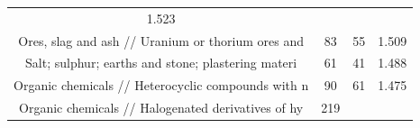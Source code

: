 \documentclass[10pt,]{article}
\begin{document}
\begin{longtable}[]{@{}cccc@{}}
\begin{minipage}[t]{0.09\columnwidth}
1.523\strut
\end{minipage}\tabularnewline
\begin{minipage}[t]{0.38\columnwidth}\centering\strut
Ores, slag and ash // Uranium or thorium ores and\strut
\end{minipage} & \begin{minipage}[t]{0.21\columnwidth}\centering\strut
83\strut
\end{minipage} & \begin{minipage}[t]{0.20\columnwidth}\centering\strut
55\strut
\end{minipage} & \begin{minipage}[t]{0.09\columnwidth}\centering\strut
1.509\strut
\end{minipage}\tabularnewline
\begin{minipage}[t]{0.38\columnwidth}\centering\strut
Salt; sulphur; earths and stone; plastering materi\strut
\end{minipage} & \begin{minipage}[t]{0.21\columnwidth}\centering\strut
61\strut
\end{minipage} & \begin{minipage}[t]{0.20\columnwidth}\centering\strut
41\strut
\end{minipage} & \begin{minipage}[t]{0.09\columnwidth}\centering\strut
1.488\strut
\end{minipage}\tabularnewline
\begin{minipage}[t]{0.38\columnwidth}\centering\strut
Organic chemicals // Heterocyclic compounds with n\strut
\end{minipage} & \begin{minipage}[t]{0.21\columnwidth}\centering\strut
90\strut
\end{minipage} & \begin{minipage}[t]{0.20\columnwidth}\centering\strut
61\strut
\end{minipage} & \begin{minipage}[t]{0.09\columnwidth}\centering\strut
1.475\strut
\end{minipage}\tabularnewline
\begin{minipage}[t]{0.38\columnwidth}\centering\strut
Organic chemicals // Halogenated derivatives of hy\strut
\end{minipage} & \begin{minipage}[t]{0.21\columnwidth}\centering\strut
219\strut
\end{minipage} & \begin{minipage}[t]{0.20\columnwidth}\centering\strut

\end{minipage}
\end{longtable}
\end{document}
